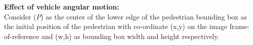 




\textbf{Effect of vehicle angular motion:} \\
Consider ($P$) as the center of the lower edge of the pedestrian bounding box as the initial position of the pedestrian with co-ordinate (x,y) on the image frame-of-reference and (w,h) as bounding box width and height respectively.




